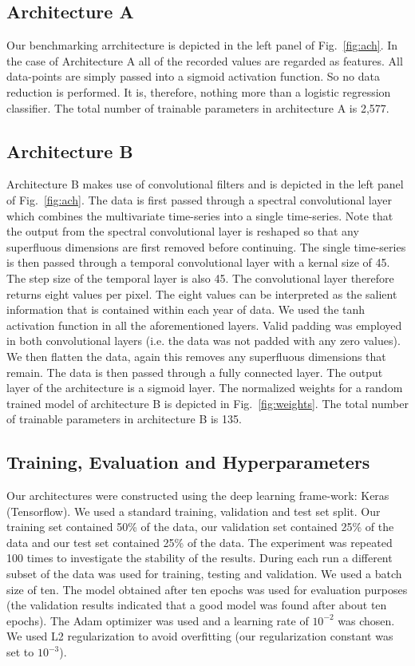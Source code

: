 \documentclass{article}
\begin{document}
\subsection{Architecture A}
Our benchmarking arrchitecture is depicted in the left panel of Fig.~\ref{fig:ach}. In the case of Architecture A all of the recorded values are regarded as features. All data-points are simply passed into a sigmoid activation function. So no data reduction is performed. It is, therefore,  nothing more than a logistic regression classifier.
The total number of trainable parameters in architecture A is 2,577.

\subsection{Architecture B}
Architecture B makes use of convolutional filters and is depicted in the left panel of Fig.~\ref{fig:ach}. The data is first passed through a spectral convolutional layer which combines the multivariate time-series into a single time-series. Note that the output from the spectral convolutional layer is reshaped so that any superfluous dimensions are first removed before continuing. The single time-series is then passed through a temporal convolutional layer with a kernal size of 45. The step size of the temporal layer is also 45. The convolutional layer therefore returns eight values per pixel. The eight values can be interpreted as the salient information that is contained within each year of data. We used the tanh activation function in all the aforementioned layers. Valid padding was employed in both convolutional layers (i.e. the data was not padded with any zero values). We then flatten the data, again this removes any superfluous dimensions that remain. The data is then passed through a fully connected layer. The output layer of the architecture is a sigmoid layer. The normalized weights for a random trained model of architecture B is depicted in Fig.~\ref{fig:weights}. The total number of trainable parameters in architecture B is 135.
     

\subsection{Training, Evaluation and Hyperparameters}
\label{sec:hyper}
Our architectures were constructed using the deep learning frame-work: Keras (Tensorflow). We used a standard training, validation and test set split. Our training set contained 50\% of the data, our validation set contained 25\% of the data and our test set contained 25\% of the data. The experiment was repeated 100 times to investigate the stability of the results. During each run a different subset of the data was used for training, testing and validation. We used a batch size of ten. The model obtained after ten epochs was used for evaluation purposes (the validation results indicated that a good model was found after about ten epochs). The Adam optimizer was used and a learning rate of $10^{-2}$ was chosen. We used L2 regularization to avoid overfitting (our regularization constant was set to $10^{-3}$).    
 
\end{document}
